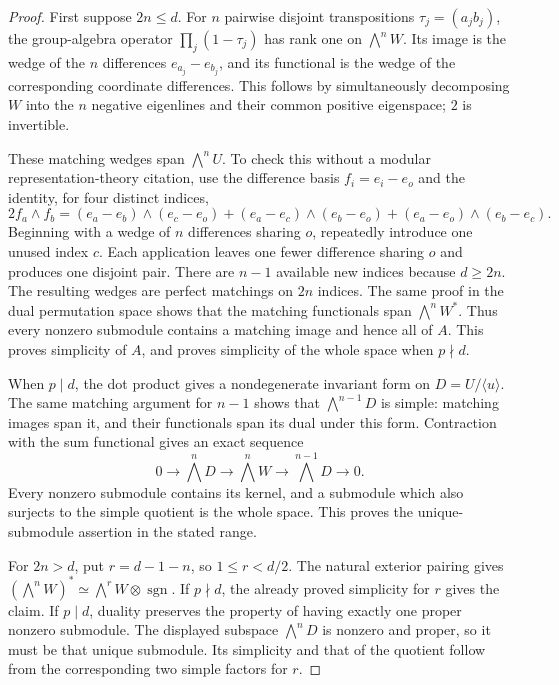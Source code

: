 \begin{proof}
First suppose $2n\leq d$.  For $n$ pairwise disjoint transpositions
$\tau_j=(a_jb_j)$, the group-algebra operator
$\prod_j(1-\tau_j)$ has rank one on $\bigwedge^nW$.  Its image
is the wedge of the $n$ differences $e_{a_j}-e_{b_j}$, and its
functional is the wedge of the corresponding coordinate
differences.  This follows by simultaneously decomposing $W$
into the $n$ negative eigenlines and their common positive
eigenspace; $2$ is invertible.

These matching wedges span $\bigwedge^nU$.  To check this without
a modular representation-theory citation, use the difference
basis $f_i=e_i-e_o$ and the identity, for four distinct indices,
\[
 2f_a\wedge f_b
 =(e_a-e_b)\wedge(e_c-e_o)
  +(e_a-e_c)\wedge(e_b-e_o)
  +(e_a-e_o)\wedge(e_b-e_c).
\]
Beginning with a wedge of $n$ differences sharing $o$, repeatedly
introduce one unused index $c$.  Each application leaves one
fewer difference sharing $o$ and produces one disjoint pair.
There are $n-1$ available new indices because $d\geq2n$.
The resulting wedges are perfect matchings on $2n$ indices.
The same proof in the dual permutation space shows that the
matching functionals span $\bigwedge^nW^*$.
Thus every nonzero submodule contains a matching image and hence
all of $A$.  This proves simplicity of $A$, and proves simplicity
of the whole space when $p\nmid d$.

When $p\mid d$, the dot product gives a nondegenerate invariant
form on $D=U/\langle u\rangle$.  The same matching argument for
$n-1$ shows that $\bigwedge^{n-1}D$ is simple: matching images
span it, and their functionals span its dual under this form.
Contraction with the sum functional gives an exact sequence
\[
 0\longrightarrow\bigwedge^nD\longrightarrow\bigwedge^nW
 \longrightarrow\bigwedge^{n-1}D\longrightarrow0.
 \tag{*}
\]
Every nonzero submodule contains its kernel, and a submodule
which also surjects to the simple quotient is the whole space.
This proves the unique-submodule assertion in the stated range.

For $2n>d$, put $r=d-1-n$, so $1\leq r<d/2$.
The natural exterior pairing gives
$(\bigwedge^nW)^*\simeq\bigwedge^rW\otimes\operatorname{sgn}$.
If $p\nmid d$, the already proved simplicity for $r$ gives the
claim.  If $p\mid d$, duality preserves the property of having
exactly one proper nonzero submodule.  The displayed subspace
$\bigwedge^nD$ is nonzero and proper, so it must be that unique
submodule.  Its simplicity and that of the quotient follow
from the corresponding two simple factors for $r$.
\end{proof}

